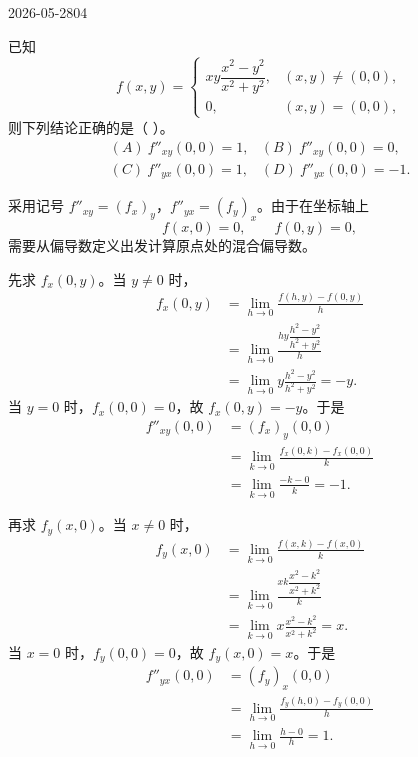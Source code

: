 \begin{mistake}{2026-05-28}{04}

\begin{problemcontent}
已知
\[
f(x,y)=
\begin{cases}
xy\dfrac{x^2-y^2}{x^2+y^2},&(x,y)\ne(0,0),\\[6pt]
0,&(x,y)=(0,0),
\end{cases}
\]
则下列结论正确的是（ ）。
\[
\begin{array}{ll}
(A)\ f''_{xy}(0,0)=1, & (B)\ f''_{xy}(0,0)=0,\\[4pt]
(C)\ f''_{yx}(0,0)=1, & (D)\ f''_{yx}(0,0)=-1.
\end{array}
\]
\end{problemcontent}

\begin{solutioncontent}
采用记号 \(f''_{xy}=(f_x)_y\)，\(f''_{yx}=(f_y)_x\)。由于在坐标轴上
\[
f(x,0)=0,\qquad f(0,y)=0,
\]
需要从偏导数定义出发计算原点处的混合偏导数。

先求 \(f_x(0,y)\)。当 \(y\ne 0\) 时，
\[
\begin{aligned}
f_x(0,y)
&=\lim_{h\to 0}\frac{f(h,y)-f(0,y)}{h}\\
&=\lim_{h\to 0}\frac{hy\dfrac{h^2-y^2}{h^2+y^2}}{h}\\
&=\lim_{h\to 0}y\frac{h^2-y^2}{h^2+y^2}
=-y.
\end{aligned}
\]
当 \(y=0\) 时，\(f_x(0,0)=0\)，故 \(f_x(0,y)=-y\)。于是
\[
\begin{aligned}
f''_{xy}(0,0)
&=(f_x)_y(0,0)\\
&=\lim_{k\to 0}\frac{f_x(0,k)-f_x(0,0)}{k}\\
&=\lim_{k\to 0}\frac{-k-0}{k}=-1.
\end{aligned}
\]

再求 \(f_y(x,0)\)。当 \(x\ne 0\) 时，
\[
\begin{aligned}
f_y(x,0)
&=\lim_{k\to 0}\frac{f(x,k)-f(x,0)}{k}\\
&=\lim_{k\to 0}\frac{xk\dfrac{x^2-k^2}{x^2+k^2}}{k}\\
&=\lim_{k\to 0}x\frac{x^2-k^2}{x^2+k^2}
=x.
\end{aligned}
\]
当 \(x=0\) 时，\(f_y(0,0)=0\)，故 \(f_y(x,0)=x\)。于是
\[
\begin{aligned}
f''_{yx}(0,0)
&=(f_y)_x(0,0)\\
&=\lim_{h\to 0}\frac{f_y(h,0)-f_y(0,0)}{h}\\
&=\lim_{h\to 0}\frac{h-0}{h}=1.
\end{aligned}
\]


\end{solutioncontent}
\end{mistake}
